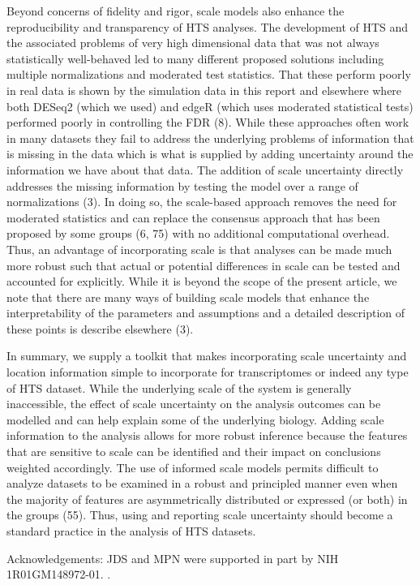 \documentclass[
]{article}
\providecommand{\DIFadd}[1]{{\protect\color{blue}\uwave{#1}}} %
\providecommand{\DIFaddbegin}{} %
\providecommand{\DIFaddend}{} %
\newcommand{\DIFaddincludegraphics}[2][]{{\color{blue}\fbox{\DIFOincludegraphics[#1]{#2}}}} %
\DeclareRobustCommand{\DIFaddbegin}{\DIFOaddbegin \let\includegraphics\DIFaddincludegraphics} %
\DeclareRobustCommand{\DIFaddend}{\DIFOaddend \let\includegraphics\DIFOincludegraphics} %
\begin{document}
Beyond concerns of fidelity and rigor, scale models also enhance the
reproducibility and transparency of HTS analyses. The development of HTS
and the associated problems of very high dimensional data that was not
always statistically well-behaved led to many different proposed
solutions including multiple normalizations and moderated test
statistics. That these perform poorly in real data is shown by the
simulation data in this report and elsewhere where both DESeq2 (which we
used) and edgeR (which uses moderated statistical tests) performed
poorly in controlling the FDR (8). While these approaches often work in
many datasets they fail to address the underlying problems of
information that is missing in the data which is what is supplied by
adding uncertainty around the information we have about that data. The
addition of scale uncertainty directly addresses the missing information
by testing the model over a range of normalizations (3). In doing so,
the scale-based approach removes the need for moderated statistics and
can replace the consensus approach that has been proposed by some groups
(6, 75) with no additional computational overhead. Thus, an advantage of
incorporating scale is that analyses can be made much more robust such
that actual or potential differences in scale can be tested and
accounted for explicitly. While it is beyond the scope of the present
article, we note that there are many ways of building scale models that
enhance the interpretability of the parameters and assumptions and a
detailed description of these points is describe elsewhere (3).

In summary, we supply a toolkit that makes incorporating scale
uncertainty and location information simple to incorporate for
transcriptomes or indeed any type of HTS dataset. While the underlying
scale of the system is generally inaccessible, the effect of scale
uncertainty on the analysis outcomes can be modelled and can help
explain some of the underlying biology. Adding scale information to the
analysis allows for more robust inference because the features that are
sensitive to scale can be identified and their impact on conclusions
weighted accordingly. The use of informed scale models permits difficult
to analyze datasets to be examined in a robust and principled manner
even when the majority of features are asymmetrically distributed or
expressed (or both) in the groups (55). Thus, using and reporting scale
uncertainty should become a standard practice in the analysis of HTS
datasets.

Acknowledgements: JDS and MPN were supported in part by NIH
1R01GM148972-01.  \DIFaddbegin \DIFadd{GBG is supported by NSERC grant RGPIN-06519-2025}\DIFaddend .
\end{document}
